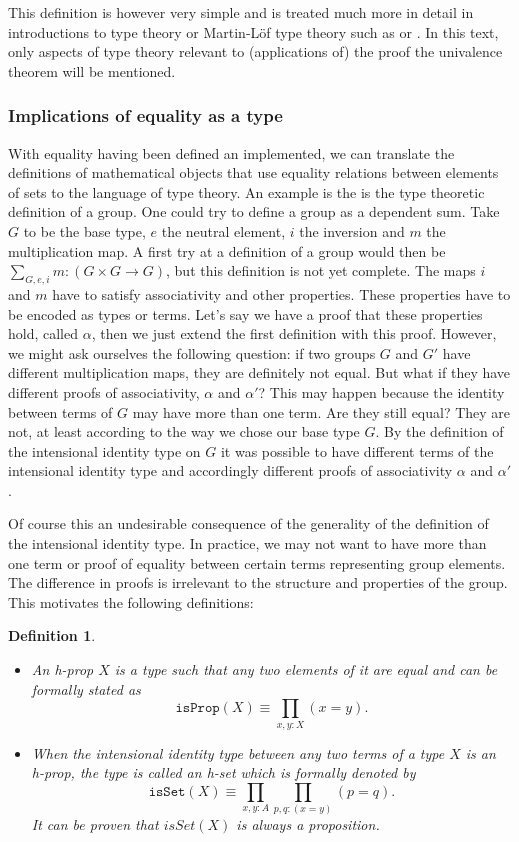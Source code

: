 \documentclass[12pt,a4paper,twoside,xetex,draft]{book}
\newcommand{\keyword}[1]{\emph{#1}\index{#1}}
\newtheorem{definition}[theorem]{Definition}
\newcommand{\op}[1]{\mathtt{#1}}
\begin{document}
This definition is however very simple and is treated much more in detail in introductions to type theory or Martin-L\"of type theory such as \cite{Palmgren2014} or \cite{Voevodsky2013}. In this text, only aspects of type theory relevant to (applications of) the proof the univalence theorem will be mentioned.

\subsubsection{Implications of equality as a type}

With equality having been defined an implemented, we can translate the definitions of mathematical objects that use equality relations between elements of sets to the language of type theory. An example is the is the type theoretic definition of a group. One could try to define a group as a dependent sum. Take $G$ to be the base type, $e$ the neutral element, $i$ the inversion and $m$ the multiplication map. A first try at a definition of a group would then be $\sum_{G,e,i}m:(G\times G \rightarrow G)$, but this definition is not yet complete. The maps $i$ and $m$  have to satisfy associativity and other properties. These properties have to be encoded as types or terms. Let's say we have a proof that these properties hold, called $\alpha$, then we just extend the first definition with this proof. However, we might ask ourselves the following question: if two groups $G$ and $G'$ have different multiplication maps, they are definitely not equal. But what if they have different proofs of associativity, $\alpha$ and $\alpha'$? This may happen because the identity between terms of  $G$ may have more than one term. Are they still equal? They are not, at least according to the way we chose our base type $G$. By the definition of the intensional identity type on $G$ it was possible to have different terms of the intensional identity type and accordingly different proofs of associativity $\alpha$ and $\alpha'$.

Of course this an undesirable consequence of the generality of the definition of the intensional identity type. In practice, we may not want to have more than one term or proof of equality between certain terms representing group elements. The difference in proofs is irrelevant to the structure and properties of the group. This motivates the following definitions:

\begin{definition}
\begin{itemize}
\item  An \keyword{h-prop} $X$ is a type such that any two elements of it are equal and can be formally stated as $$\op{isProp}(X) \equiv \prod_{x,y:X}(x=y).$$
\item When the intensional identity type between any two terms of a type $X$ is an h-prop, the type is called an \keyword{h-set} which is formally denoted by $$\op{isSet}(X) \equiv \prod_{x,y:A}\prod_{p,q:(x=y)}(p=q).$$ It can be proven that $isSet(X)$ is always a proposition.
\end{itemize}
\end{definition}
\end{document}
